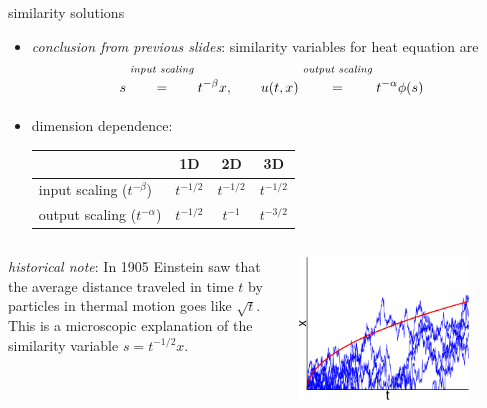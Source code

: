 \begin{frame}{similarity solutions}

\begin{itemize}
\item \emph{conclusion from previous slides}: similarity variables for heat equation are
	$$s \stackrel{\text{\emph{input scaling}}}{\phantom{\Big|}=\phantom{\Big|}} t^{-\beta} x, \qquad u(t,x) \stackrel{\text{\emph{output scaling}}}{\phantom{\Big|}=\phantom{\Big|}} t^{-\alpha} \phi(s)$$
\item dimension dependence:
	\begin{tabular}{l|ccc}
	               & 1D & 2D & 3D \\ \hline
	input scaling ($t^{-\beta}$)   & $t^{-1/2}$ & $t^{-1/2}$ & $t^{-1/2}$ \\
	output scaling ($t^{-\alpha}$) & $t^{-1/2}$ & $t^{-1}$ & $t^{-3/2}$
	\end{tabular}
\end{itemize}
\begin{columns}
\begin{column}{0.6\textwidth}
\emph{historical note}:  In 1905 Einstein saw that the average distance traveled in time $t$ by particles in thermal motion goes like $\sqrt{t}$.  This is a microscopic explanation of the similarity variable $s = t^{-1/2}x$.
\end{column}
\begin{column}{0.4\textwidth}
\hfill \includegraphics[width=0.8\textwidth]{photos/brownian}
\end{column}
\end{columns}
\end{frame}
